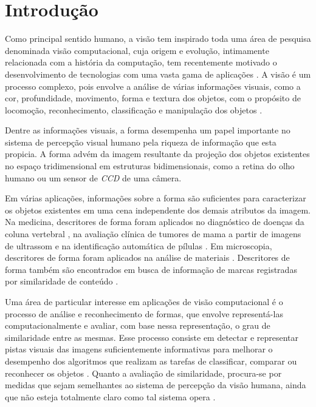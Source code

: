 
\chapter{Introdução \label{chap:INTRO}}


Como principal sentido humano, a visão tem inspirado toda uma área de pesquisa denominada visão computacional, cuja origem e evolução, intimamente relacionada com a história da computação, tem recentemente motivado o desenvolvimento de tecnologias com uma vasta gama de aplicações \cite{Costa:2009}. A visão é um processo complexo, pois envolve a análise de várias informações visuais, como a cor, profundidade, movimento, forma e textura dos objetos, com o propósito de locomoção, reconhecimento, classificação e manipulação dos objetos \cite{Ullman:1996}.

Dentre as informações visuais, a forma desempenha um papel importante no sistema de percepção visual humano pela riqueza de informação que esta propicia. A forma advém da imagem resultante da projeção dos objetos existentes no espaço tridimensional em estruturas bidimensionais, como a retina do olho humano ou um sensor de \emph{CCD} de uma câmera.

Em várias aplicações\cite{Zhang201661,Zhao20153203}, informações sobre a forma são suficientes para caracterizar os objetos existentes em uma cena independente dos demais atributos da imagem. Na medicina, descritores de forma foram aplicados no diagnóstico de doenças da coluna vertebral \cite{Lee:2009}, na avaliação clínica de tumores de mama a partir de imagens de ultrassom \cite{Yang:2009} e na identificação automática de pílulas \cite{Ushizima:2015}. Em microscopia, descritores de forma foram aplicados na análise de materiais \cite{Zhang201661}. Descritores de forma também são encontrados em busca de informação de marcas registradas por similaridade de conteúdo \cite{MohdAnuar2013105,Qi20102017}.

Uma área de particular interesse em aplicações de visão computacional é o processo de análise e reconhecimento de formas, que envolve representá-las computacionalmente e avaliar, com base nessa representação, o grau de similaridade entre as mesmas. Esse processo consiste em detectar e representar pistas visuais das imagens suficientemente informativas para melhorar o desempenho dos algoritmos que realizam as tarefas de classificar, comparar ou reconhecer os objetos \cite{Escolano:2009}. Quanto a avaliação de similaridade, procura-se por medidas que sejam semelhantes ao sistema de percepção da visão humana, ainda que não esteja totalmente claro como tal sistema opera \cite{4815272}. 

